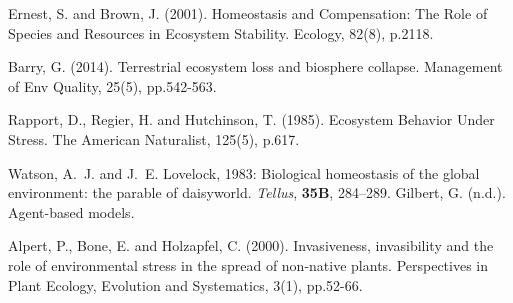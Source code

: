 \documentclass[12pt]{article}
\begin{document}
\begin{thebibliography}{99}
    Ernest, S. and Brown, J. (2001). Homeostasis and Compensation: The
    Role of Species and Resources in Ecosystem Stability. Ecology,
    82(8), p.2118.

   Barry, G. (2014). Terrestrial ecosystem loss
    and biosphere collapse. Management of Env Quality, 25(5), pp.542-563.

  Rapport, D., Regier, H. and Hutchinson, T. (1985). Ecosystem
  Behavior Under Stress. The American Naturalist, 125(5), p.617.

  Watson, A.~J. and J.~E. Lovelock, 1983: Biological homeostasis of the global
  environment: the parable of daisyworld. {\em Tellus}, {\bf 35B},
  284--289.
  Gilbert, G. (n.d.). Agent-based models.

Alpert, P., Bone, E. and Holzapfel, C. (2000). Invasiveness, invasibility and the role of environmental stress in the spread of non-native plants. Perspectives in Plant Ecology, Evolution and Systematics, 3(1), pp.52-66.

\end{thebibliography}
\end{document}
